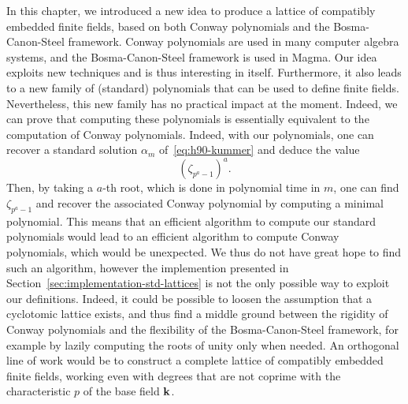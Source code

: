 In this chapter, we introduced a new idea to produce a lattice of compatibly
embedded finite fields, based on both Conway polynomials and the Bosma-Canon-Steel
framework. Conway polynomials are used in many computer algebra systems, and
the Bosma-Canon-Steel framework is used in Magma. Our idea exploits new
techniques and is thus
interesting in itself. Furthermore, it also leads to a new family of (standard)
polynomials that can be used to define finite fields. Nevertheless, this new
family has no practical impact at the moment. Indeed, we can prove that
computing these polynomials is essentially equivalent to the computation of
Conway polynomials. Indeed, with our polynomials, one can recover a standard
solution $\alpha_m$ of~\eqref{eq:h90-kummer} and deduce the value
\[
  (\zeta_{p^a-1})^a.
\]
Then, by taking a $a$-th root, which is done in polynomial time in $m$, one can
find $\zeta_{p^a-1}$ and recover the associated Conway polynomial by computing a
minimal polynomial. This means that an efficient algorithm to compute our
standard polynomials would lead to an efficient algorithm to compute Conway
polynomials, which would be unexpected. We thus do not have great hope to find
such an algorithm, however the implemention presented in
Section~\ref{sec:implementation-std-lattices} is not the only possible way to
exploit our definitions. Indeed, it could be possible to loosen the assumption
that a cyclotomic lattice exists, and thus find a middle ground between the
rigidity of Conway polynomials and the flexibility of the Bosma-Canon-Steel
framework, for example by lazily computing the roots of unity only when needed.
An orthogonal line of work would be to construct a complete lattice of
compatibly embedded finite fields, \ie working even with degrees that are not
coprime with the characteristic $p$ of the base field $\mathbf{k}$.
%
